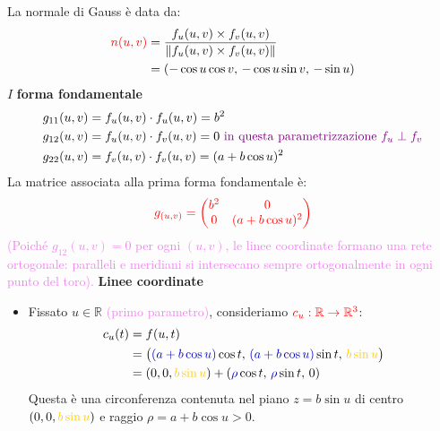 \begin{esempio}
        La normale di Gauss è data da:
        \begin{align*}
        \textcolor{red}{n(u,v)} &= \frac{f_u(u,v) \times f_v(u,v)}{\lVert f_u(u,v) \times f_v(u,v)\rVert} \\
        &= (-\cos u \cos v, \, -\cos u \sin v, \, -\sin u)
        \end{align*}
        $I$ \textbf{forma fondamentale}
        \begin{align*}
        g_{11}(u,v) &= f_u(u,v) \cdot f_u(u,v) = b^2 \\
        g_{12}(u,v) &= f_u(u,v) \cdot f_v(u,v) = 0 \textcolor{violet}{\text{ in questa parametrizzazione } f_u \perp f_v }\\
        g_{22}(u,v) &= f_v(u,v) \cdot f_v(u,v) = (a + b \cos u)^2
        \end{align*}
        La matrice associata alla prima forma fondamentale è:
        \[
        \textcolor{red}{g_{(u,v)} = \begin{pmatrix}
        b^2 & 0 \\
        0 & (a + b \cos u)^2
        \end{pmatrix}}
        \]
        \textcolor{violet}{(Poiché $g_{12}(u,v) = 0$ per ogni $(u,v)$, le linee coordinate formano una rete ortogonale: paralleli e meridiani si intersecano sempre ortogonalmente in ogni punto del toro).}
        \newpage
        \textbf{Linee coordinate}
        \begin{itemize}
            \item Fissato $u \in \mathbb{R}$ \textcolor{violet}{(primo parametro)}, consideriamo $\textcolor{red}{c_u : \mathbb{R} \to \mathbb{R}^3}$:
            \begin{align*}
            c_u(t) &= f(u,t) \\
            &= \big( \textcolor{blu}{(a + b \cos u)}\cos t, \, \textcolor{blu}{(a + b \cos u)}\sin t, \, \textcolor{amber}{b \sin u} \big) \\
            &= (0, 0, \textcolor{amber}{b \sin u}) + (\textcolor{blu}{\rho} \cos t, \, \textcolor{blu}{\rho} \sin t, \, 0)
            \end{align*}
            Questa è una circonferenza contenuta nel piano \textcolor{amber}{$z = b \sin u$} di centro $(0, 0,\textcolor{amber}{ b \sin u})$ e raggio \textcolor{blu}{$\rho = a + b \cos u>0$}.
            

\end{itemize}
\end{esempio}
